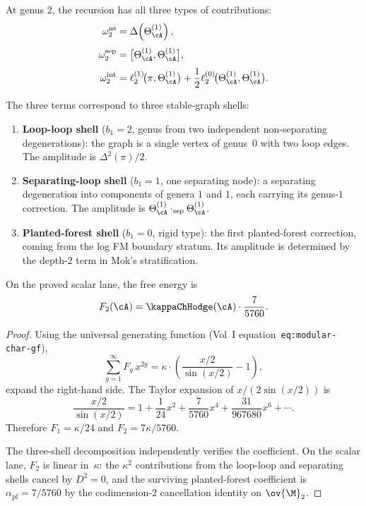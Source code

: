 \begin{computation}
\label{comp:genus-2-three-shell}
At genus $2$, the recursion has all three types of contributions:
\begin{align}
\omega_2^{\mathrm{ns}} &= \Delta\!\left(\Theta_\cA^{(1)}\right),
\\[3pt]
\omega_2^{\mathrm{sep}} &= \bigl[\Theta_\cA^{(1)}, \Theta_\cA^{(1)}\bigr],
\\[3pt]
\omega_2^{\mathrm{int}} &= \ell_2^{(1)}\!\bigl(\pi, \Theta_\cA^{(1)}\bigr)
 + \frac{1}{2}\ell_2^{(0)}\!\bigl(\Theta_\cA^{(1)}, \Theta_\cA^{(1)}\bigr).
\end{align}

The three terms correspond to three stable-graph shells:
\begin{enumerate}[label=\textup{(\alph*)}]
\item \textbf{Loop-loop shell} ($b_1 = 2$, genus from two independent
 non-separating degenerations): the graph is a single vertex of genus~$0$
 with two loop edges. The amplitude is $\Delta^2(\pi)/2$.
\item \textbf{Separating-loop shell} ($b_1 = 1$, one separating node): a separating
 degeneration into components of genera $1$ and $1$, each carrying its genus-$1$
 correction. The amplitude is $\Theta_\cA^{(1)} \cdot_{\mathrm{sep}} \Theta_\cA^{(1)}$.
\item \textbf{Planted-forest shell} ($b_1 = 0$, rigid type): the first planted-forest
 correction, coming from the log FM boundary stratum. Its amplitude is determined by
 the depth-$2$ term in Mok's stratification.
\end{enumerate}

On the proved scalar lane, the free energy is
\begin{equation}
F_2(\cA) = \kappaChHodge(\cA) \cdot \frac{7}{5760}.
\end{equation}
\end{computation}

\begin{proof}
Using the universal generating function (Vol~I equation~\texttt{eq:modular-char-gf}),
\[
\sum_{g=1}^{\infty} F_g \, x^{2g} = \kappa \cdot \left(\frac{x/2}{\sin(x/2)} - 1\right),
\]
expand the right-hand side. The Taylor expansion of $x/(2\sin(x/2))$ is
\[
\frac{x/2}{\sin(x/2)}
= 1 + \frac{1}{24}x^2 + \frac{7}{5760}x^4 + \frac{31}{967680}x^6 + \cdots.
\]
Therefore $F_1 = \kappa/24$ and $F_2 = 7\kappa/5760$.

The three-shell decomposition independently verifies the coefficient.
On the scalar lane, $F_2$ is linear in~$\kappa$: the $\kappa^2$
contributions from the loop-loop and separating shells cancel by
$D^2 = 0$, and the surviving planted-forest coefficient is
$\alpha_{\mathrm{pf}} = 7/5760$ by the codimension-$2$
cancellation identity on $\ov{\M}_2$.
\end{proof}

